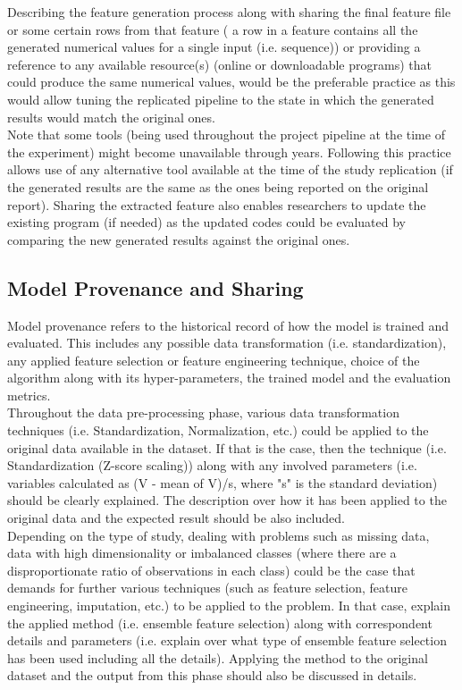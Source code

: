     Describing the feature generation process along with sharing the final feature file or some certain rows from that feature ( a row 
    in a feature contains all the generated numerical values for a single input (i.e. sequence)) or providing a reference to any available 
    resource(s) (online or downloadable programs) that could produce the same numerical values, 
    would be the preferable practice as this would allow tuning the replicated pipeline to the state in which the generated results 
    would match the original ones. \\
    
    Note that some tools (being used throughout the project pipeline at the time of the experiment) might become unavailable through years. 
    Following this practice allows use of any alternative tool available at the time of the study replication (if the generated results are 
    the same as the ones being reported on the original report). Sharing the extracted feature also enables researchers to update the existing 
    program (if needed) as the updated codes could be evaluated by comparing the new generated results against the original ones.
    
\subsection{Model Provenance and Sharing}

    Model provenance refers to the historical record of how the model is trained and evaluated. This includes any possible 
    data transformation (i.e. standardization), any applied feature selection or feature engineering technique, choice of 
    the algorithm along with its hyper-parameters, the trained model and the evaluation metrics.\\
    
    Throughout the data pre-processing phase, various data transformation techniques (i.e. Standardization, Normalization, etc.)
    could be applied to the original data available in the dataset. If that is the case, then the technique 
    (i.e. Standardization (Z-score scaling)) along with any involved parameters 
    (i.e. variables calculated as (V - mean of V)/s, where "s" is the standard deviation)
    should be clearly explained. The description over how it has been applied to the original data  and the expected result 
    should be also included.\\
    
    Depending on the type of study, dealing with problems such as missing data, data with high dimensionality or imbalanced classes 
    (where there are a disproportionate ratio of observations in each class) could be the case that demands for further various techniques 
    (such as feature selection, feature engineering, imputation, etc.) to be applied to the problem. In that case, explain the applied method 
    (i.e. ensemble feature selection) along with correspondent details and parameters (i.e. explain over what type of ensemble feature selection 
    has been used including all the details). Applying the method to the original dataset and the output from this phase should also be 
    discussed in details.\\
    
